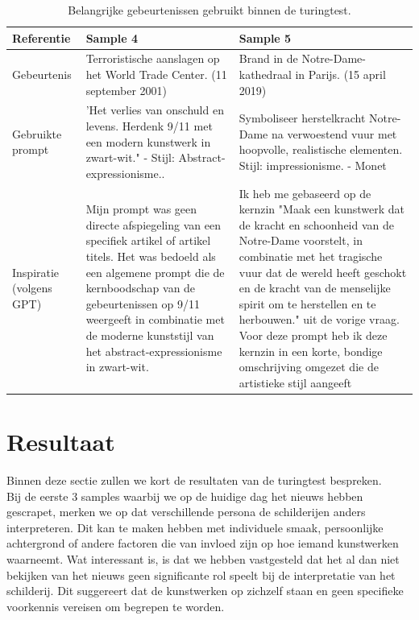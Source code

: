 \begin{table}[htbp]
\begin{tabular}{|p{2.5cm}|p{6.8cm}|p{6.8cm}|}
        \hline
        \textbf{Referentie} &  \textbf{Sample 4} & \textbf{Sample 5} \\
        \hline
        Gebeurtenis &Terroristische aanslagen op het World Trade Center. (11 september 2001)&  Brand in de Notre-Dame-kathedraal in Parijs. (15 april 2019) \\
        \hline
        Gebruikte prompt & 'Het verlies van onschuld en levens. Herdenk 9/11 met een modern kunstwerk in zwart-wit." - Stijl: Abstract-expressionisme.. & Symboliseer herstelkracht Notre-Dame na verwoestend vuur met hoopvolle, realistische elementen. Stijl: impressionisme. - Monet \\
        \hline
        Inspiratie (volgens GPT) & Mijn prompt was geen directe afspiegeling van een specifiek artikel of artikel titels. Het was bedoeld als een algemene prompt die de kernboodschap van de gebeurtenissen op 9/11 weergeeft in combinatie met de moderne kunststijl van het abstract-expressionisme in zwart-wit.& Ik heb me gebaseerd op de kernzin "Maak een kunstwerk dat de kracht en schoonheid van de Notre-Dame voorstelt, in combinatie met het tragische vuur dat de wereld heeft geschokt en de kracht van de menselijke spirit om te herstellen en te herbouwen." uit de vorige vraag. Voor deze prompt heb ik deze kernzin in een korte, bondige omschrijving omgezet die de artistieke stijl aangeeft \\
        \hline
    \end{tabular}
    \caption{Belangrijke gebeurtenissen gebruikt binnen de turingtest.}
    \label{table:events_samples}
\end{table}
\pagebreak
\section{Resultaat}
\label{section:result}
Binnen deze sectie zullen we kort de resultaten van de turingtest bespreken. \\

Bij de eerste 3 samples waarbij we op de huidige dag het nieuws hebben gescrapet, merken we op dat verschillende persona de schilderijen anders interpreteren. Dit kan te maken hebben met individuele smaak, persoonlijke achtergrond of andere factoren die van invloed zijn op hoe iemand kunstwerken waarneemt. Wat interessant is, is dat we hebben vastgesteld dat het al dan niet bekijken van het nieuws geen significante rol speelt bij de interpretatie van het schilderij. Dit suggereert dat de kunstwerken op zichzelf staan en geen specifieke voorkennis vereisen om begrepen te worden. \\

